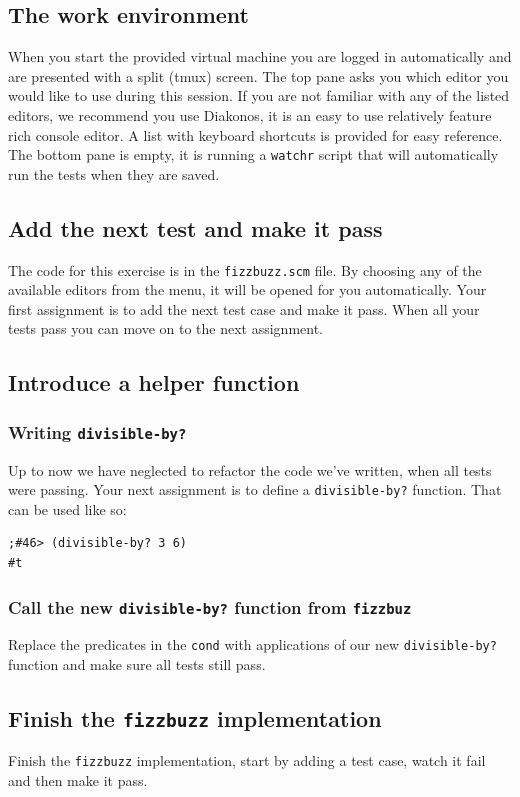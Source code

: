 \documentclass[12pt,a4paper,english,twoside]{article}
\begin{document}
\subsection{The work environment}
When you start the provided virtual machine you are logged in automatically 
and are presented with a split (tmux) screen. The top pane asks you which editor you 
would like to use during this session. If you are not familiar with any of the listed editors, we recommend you use Diakonos, it is an easy to use relatively feature rich console editor. A list with keyboard shortcuts is provided for easy reference. The bottom pane is empty, it is running a \texttt{watchr} script that will automatically run the tests when they are 
saved. 
\subsection{Add the next test and make it pass}
The code for this exercise is in the \texttt{fizzbuzz.scm} file.  By choosing 
any of the available editors from the menu, it will be opened for you 
automatically. Your first assignment is to add the next test case and make it 
pass. When all your tests pass you can move on to the next assignment.
\subsection{Introduce a helper function}
\subsubsection{Writing \texttt{divisible-by?}}
Up to now we have neglected to refactor the code 
we've written, when all tests were passing. Your next assignment is to define 
a \texttt{divisible-by?} function. That can be used like so:
\begin{lstlisting}
;#46> (divisible-by? 3 6)
#t
\end{lstlisting}
\subsubsection{Call the new \texttt{divisible-by?} function from 
\texttt{fizzbuz}}
Replace the predicates in the \texttt{cond} with applications of our new 
\texttt{divisible-by?} function and make sure all tests still pass.
\subsection{Finish the \texttt{fizzbuzz} implementation}
Finish the \texttt{fizzbuzz} implementation, start by adding a test case, 
watch it fail and then make it pass. 
\end{document}
